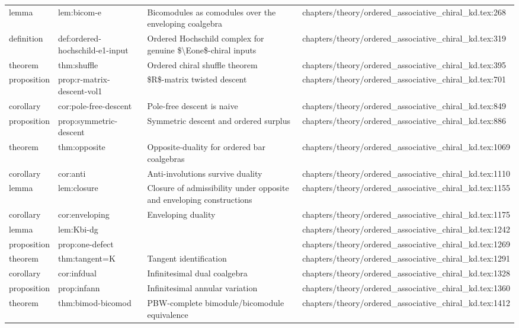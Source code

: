 \documentclass[11pt]{article}
\begin{document}
\begin{longtable}{L{0.10\textwidth}L{0.26\textwidth}L{0.42\textwidth}L{0.22\textwidth}}
lemma & lem:bicom-e & Bicomodules as comodules over the enveloping coalgebra & chapters/theory/ordered\_associative\_chiral\_kd.tex:268\\
definition & def:ordered-hochschild-e1-input & Ordered Hochschild complex for genuine \$\textbackslash{}Eone\$-chiral inputs & chapters/theory/ordered\_associative\_chiral\_kd.tex:319\\
theorem & thm:shuffle & Ordered chiral shuffle theorem & chapters/theory/ordered\_associative\_chiral\_kd.tex:395\\
proposition & prop:r-matrix-descent-vol1 & \$R\$-matrix twisted descent & chapters/theory/ordered\_associative\_chiral\_kd.tex:701\\
corollary & cor:pole-free-descent & Pole-free descent is naive & chapters/theory/ordered\_associative\_chiral\_kd.tex:849\\
proposition & prop:symmetric-descent & Symmetric descent and ordered surplus & chapters/theory/ordered\_associative\_chiral\_kd.tex:886\\
theorem & thm:opposite & Opposite-duality for ordered bar coalgebras & chapters/theory/ordered\_associative\_chiral\_kd.tex:1069\\
corollary & cor:anti & Anti-involutions survive duality & chapters/theory/ordered\_associative\_chiral\_kd.tex:1110\\
lemma & lem:closure & Closure of admissibility under opposite and enveloping constructions & chapters/theory/ordered\_associative\_chiral\_kd.tex:1155\\
corollary & cor:enveloping & Enveloping duality & chapters/theory/ordered\_associative\_chiral\_kd.tex:1175\\
lemma & lem:Kbi-dg &  & chapters/theory/ordered\_associative\_chiral\_kd.tex:1242\\
proposition & prop:one-defect &  & chapters/theory/ordered\_associative\_chiral\_kd.tex:1269\\
theorem & thm:tangent=K & Tangent identification & chapters/theory/ordered\_associative\_chiral\_kd.tex:1291\\
corollary & cor:infdual & Infinitesimal dual coalgebra & chapters/theory/ordered\_associative\_chiral\_kd.tex:1328\\
proposition & prop:infann & Infinitesimal annular variation & chapters/theory/ordered\_associative\_chiral\_kd.tex:1360\\
theorem & thm:bimod-bicomod & PBW-complete bimodule/bicomodule equivalence & chapters/theory/ordered\_associative\_chiral\_kd.tex:1412\\

\end{longtable}
\end{document}
